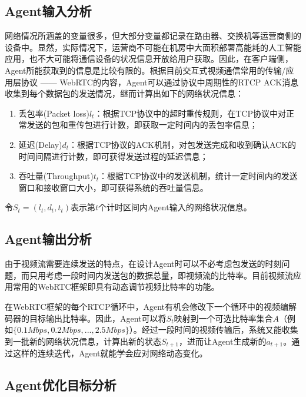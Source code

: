 \documentclass[a4paper]{ctexart}
\begin{document}
\subsection{Agent输入分析}

网络情况所涵盖的变量很多，但大部分变量都记录在路由器、交换机等运营商侧的设备中。显然，实际情况下，运营商不可能在机房中大面积部署高能耗的人工智能应用，也不大可能将通信设备的状况信息开放给用户获取。因此，在客户端侧，Agent所能获取到的信息是比较有限的。根据目前交互式视频通信常用的传输/应用层协议 —— WebRTC的内容，Agent可以通过协议中周期性的RTCP ACK消息收集到每个数据包的发送情况，继而计算出如下的网络状况信息：

\begin{enumerate}[label=\arabic*、]
	\item 丢包率(Packet loss)$l_t$：根据TCP协议中的超时重传规则，在TCP协议中对正常发送的包和重传包进行计数，即获取一定时间内的丢包率信息；
	\item 延迟(Delay)$d_t$：根据TCP协议的ACK机制，对包发送完成和收到确认ACK的时间间隔进行计数，即可获得发送过程的延迟信息；
	\item 吞吐量(Throughput)$t_t$：根据TCP协议中的发送机制，统计一定时间内的发送窗口和接收窗口大小，即可获得系统的吞吐量信息。
\end{enumerate}

令$S_t=(l_t, d_t, t_t)$表示第$t$个计时区间内Agent输入的网络状况信息。

\subsection{Agent输出分析}\label{sec:Agent输出分析}

由于视频流需要连续发送的特点，在设计Agent时可以不必考虑包发送的时刻问题，而只用考虑一段时间内发送包的数据总量，即视频流的比特率。目前视频流应用常用的WebRTC框架即具有动态调节视频比特率的功能。

在WebRTC框架的每个RTCP循环中，Agent有机会修改下一个循环中的视频编解码器的目标输出比特率。因此，Agent可以将$S_t$映射到一个可选比特率集合$A$（例如$\{0.1Mbps,0.2Mbps,...,2.5Mbps\}$）。经过一段时间的视频传输后，系统又能收集到一批新的网络状况信息，计算出新的状态$S_{t+1}$，进而让Agent生成新的$a_{t+1}$。通过这样的连续迭代，Agent就能学会应对网络动态变化。

\subsection{Agent优化目标分析}\label{sec:Agent优化目标分析}
\end{document}
